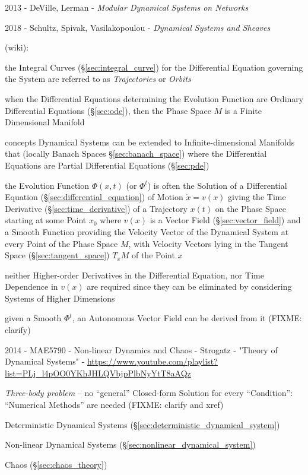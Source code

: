 2013 - DeVille, Lerman - \emph{Modular Dynamical Systems on Networks}

2018 - Schultz, Spivak, Vasilakopoulou - \emph{Dynamical Systems and Sheaves}

(wiki):

the Integral Curves (\S\ref{sec:integral_curve}) for the Differential Equation
governing the System are referred to as \emph{Trajectories} or \emph{Orbits}

when the Differential Equations determining the Evolution Function are Ordinary
Differential Equations (\S\ref{sec:ode}), then the Phase Space $M$ is a Finite
Dimensional Manifold

concepts Dynamical Systems can be extended to Infinite-dimensional Manifolds
that (locally Banach Spaces \S\ref{sec:banach_space}) where the Differential
Equations are Partial Differential Equations (\S\ref{sec:pde})

the Evolution Function $\Phi(x,t)$ (or $\Phi^t$) is often the Solution of a
Differential Equation (\S\ref{sec:differential_equation}) of Motion $\dot{x} =
v(x)$ giving the Time Derivative (\S\ref{sec:time_derivative}) of a Trajectory
$x(t)$ on the Phase Space starting at some Point $x_0$ where $v(x)$ is a Vector
Field (\S\ref{sec:vector_field}) and a Smooth Function providing the Velocity
Vector of the Dynamical System at every Point of the Phase Space $M$, with
Velocity Vectors lying in the Tangent Space (\S\ref{sec:tangent_space}) $T_xM$
of the Point $x$

neither Higher-order Derivatives in the Differential Equation, nor Time
Dependence in $v(x)$ are required since they can be eliminated by considering
Systems of Higher Dimensions

given a Smooth $\Phi^t$, an Autonomous Vector Field can be derived from it
(FIXME: clarify)

\asterism

2014 - MAE5790 - Non-linear Dynamics and Chaos - Strogatz - "Theory of
Dynamical Systems" -
\url{https://www.youtube.com/playlist?list=PLj_l4pOO0YKhJHLQVbjpPlbNyYtT8aAQz}

\emph{Three-body problem} -- no ``general'' Closed-form Solution for every
``Condition'': ``Numerical Methods'' are needed
(FIXME: clarify and xref)

Deterministic Dynamical Systems (\S\ref{sec:deterministic_dynamical_system})

Non-linear Dynamical Systems (\S\ref{sec:nonlinear_dynamical_system})

Chaos (\S\ref{sec:chaos_theory})

